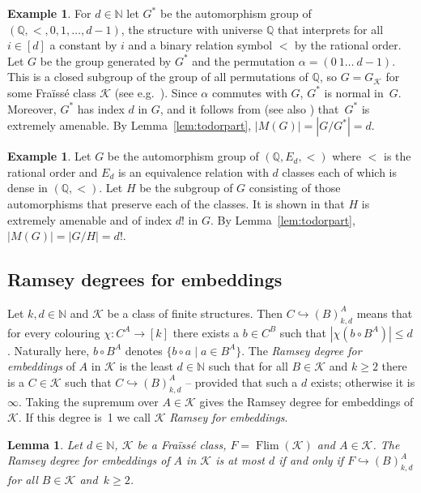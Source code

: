 \documentclass[12pt]{amsart}
\theoremstyle{plain}
\newtheorem{lemma}[theorem]{Lemma}
\theoremstyle{definition}
\newtheorem{example}[theorem]{Example}
\begin{document}
\begin{example}\label{ex:flowd}
For $d\in \mathbb{N}$ let $G^*$ be the automorphism group of $(\mathbb Q, <, 0,1, \ldots, d-1)$, the structure  
with universe $\mathbb Q$ that interprets for all $i\in[d]$ a constant by $i$ and a 
binary relation symbol $<$ by the rational order. Let $G$ be the group 
generated by $G^*$ and the permutation $\alpha=(0\ 1 \ldots\ d-1)$. 
This is a closed subgroup of the group of all permutations of $\mathbb Q$, so $G=G_{\mathcal K}$ for some Fra\"iss\'e class ${\mathcal K}$ 
(see e.g.~\cite{kb}). 
Since $\alpha$ commutes with $G$, $G^*$ is normal in~$G$. Moreover, $G^*$ has index $d$ in $G$, and it follows from
\cite[L13]{bpt} (see also \cite[P24]{bodpin}) that~$G^*$ is extremely amenable. 
By Lemma~\ref{lem:todorpart}, $|M(G)|=|G/G^*|=d$.
\end{example}

\begin{example} 
Let $G$ be the automorphism group of $(\mathbb Q,E_d,<)$ where $<$ is the rational order and $E_d$ is an equivalence relation with $d$ classes each of which 
is dense in $(\mathbb Q,<)$. Let $H$ be the subgroup of $G$ consisting of those automorphisms that preserve each of the classes.
It is shown in \cite[T8.4]{kpt} that $H$ is extremely amenable and of index $d!$ in $G$.
By Lemma~\ref{lem:todorpart}, $|M(G)|=|G/H|=d!$.
\end{example}

\subsection{Ramsey degrees for embeddings}\label{sec:remb}
Let $k,d\in{\mathbb N}$ and ${\mathcal K}$ be a class of finite structures. Then $C\hookrightarrow (B)^A_{k,d}$ means that for every colouring $\chi:C^A\to [k]$ there exists a $b\in C^B$ such that $|\chi(b\circ B^A)|\le d$.  Naturally here, $b\circ B^A$ denotes $\{b\circ a\mid a\in B^A\}$.
The {\em Ramsey degree for embeddings} of $A$ in ${\mathcal K}$ is the least $d\in{\mathbb N}$ such 
that for all $B\in {\mathcal K}$ and $k\ge 2$ there is a $C\in{\mathcal K}$ such that $C\hookrightarrow (B)^A_{k,d}$ --
provided that such a $d$ exists; otherwise it is $\infty$. 
Taking the supremum over $A\in{\mathcal K}$ gives the Ramsey degree for embeddings of ${\mathcal K}$. If this degree is~1 we call ${\mathcal K}$ {\em Ramsey for embeddings}.

\begin{lemma}\label{lem:infinite2} Let $d\in{\mathbb N}$, ${\mathcal K}$ be a Fra\"iss\'e class, $F=\operatorname{Flim}({\mathcal K})$ and $A\in{\mathcal K}$. 
The Ramsey degree for embeddings of $A$ in ${\mathcal K}$ is at most $d$ if and only if $F\hookrightarrow (B)^A_{k,d}$ 
for all $B\in{\mathcal K}$ and~$k\ge 2$.
\end{lemma}
\end{document}
